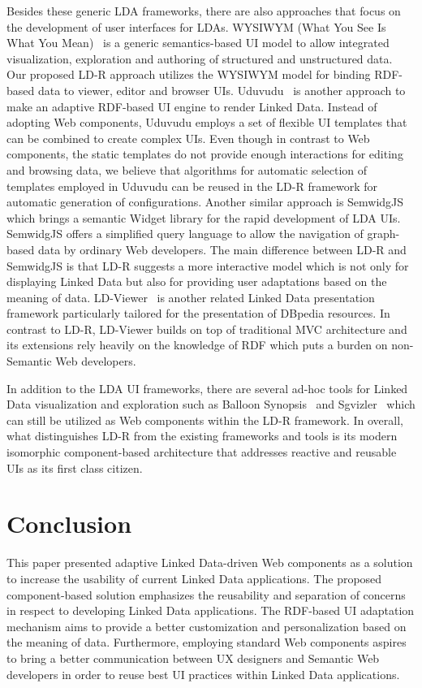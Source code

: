 \documentclass{acm_proc_article-sp}
\begin{document}
Besides these generic LDA frameworks, there are also approaches that focus on the development of user interfaces for LDAs.
WYSIWYM (What You See Is What You Mean)~\cite{WYSIWYM2014} is a generic semantics-based UI model to allow integrated visualization, exploration and authoring of structured and unstructured data.
Our proposed LD-R approach utilizes the WYSIWYM model for binding RDF-based data to viewer, editor and browser UIs.
Uduvudu~\cite{Uduvudu2015} is another approach to make an adaptive RDF-based UI engine to render Linked Data.
Instead of adopting Web components, Uduvudu employs a set of flexible UI templates that can be combined to create complex UIs. 
Even though in contrast to Web components, the static templates do not provide enough interactions for editing and browsing data, we believe that algorithms for automatic selection of templates employed in Uduvudu can be reused in the LD-R framework for automatic generation of configurations.
Another similar approach is SemwidgJS~\cite{StegemannZ14} which brings a semantic Widget library for the rapid development of LDA UIs.
SemwidgJS offers a simplified query language to allow the navigation of graph-based data by ordinary Web developers.
The main difference between LD-R and SemwidgJS is that LD-R suggests a more interactive model which is not only for displaying Linked Data but also for providing user adaptations based on the meaning of data.
LD-Viewer~\cite{Lukovnikov2014} is another related Linked Data presentation framework particularly tailored for the presentation of DBpedia resources.
In contrast to LD-R, LD-Viewer  builds on top of traditional MVC architecture and its extensions rely heavily on the knowledge of RDF which puts a burden on non-Semantic Web developers.

In addition to the LDA UI frameworks, there are several ad-hoc tools for Linked Data visualization and exploration such as Balloon Synopsis~\cite{BalloonSchlegelWSGK14} and Sgvizler~\cite{Sgvizler} which can still be utilized as Web components within the LD-R framework. 
In overall, what distinguishes LD-R from the existing frameworks and tools is its modern isomorphic component-based architecture that addresses reactive and reusable UIs as its first class citizen.

\section{Conclusion}
This paper presented adaptive Linked Data-driven Web components as a solution to increase the usability of current Linked Data applications.
The proposed component-based solution emphasizes the reusability and separation of concerns in respect to developing Linked Data applications.
The RDF-based UI adaptation mechanism aims to provide a better customization and personalization based on the meaning of data.
Furthermore, employing standard Web components aspires to bring a better communication between UX designers and Semantic Web developers in order to reuse best UI practices within Linked Data applications.
\end{document}
